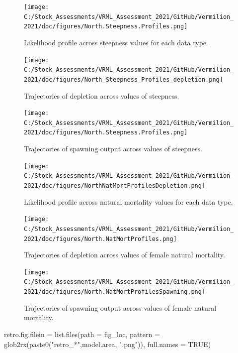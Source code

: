 \documentclass[
  english,
  a4paper,
]{article}
\newenvironment{Shaded}{\begin{snugshade}}{\end{snugshade}}
\newcommand{\AttributeTok}[1]{\textcolor[rgb]{0.77,0.63,0.00}{#1}}
\newcommand{\ConstantTok}[1]{\textcolor[rgb]{0.00,0.00,0.00}{#1}}
\newcommand{\FunctionTok}[1]{\textcolor[rgb]{0.00,0.00,0.00}{#1}}
\newcommand{\NormalTok}[1]{#1}
\newcommand{\OtherTok}[1]{\textcolor[rgb]{0.56,0.35,0.01}{#1}}
\newcommand{\StringTok}[1]{\textcolor[rgb]{0.31,0.60,0.02}{#1}}
\begin{document}
\begin{figure}
\centering
\texttt{[image: C:/Stock\_Assessments/VRML\_Assessment\_2021/GitHub/Vermilion\_2021/doc/figures/North.Steepness.Profiles.png]}
\caption{Likelihood profile across steepness values for each data type.\label{fig:h-profile}}
\end{figure}

\begin{figure}
\centering
\texttt{[image: C:/Stock\_Assessments/VRML\_Assessment\_2021/GitHub/Vermilion\_2021/doc/figures/North\_Steepness\_Profiles\_depletion.png]}
\caption{Trajectories of depletion across values of steepness.\label{fig:h-depl}}
\end{figure}

\begin{figure}
\centering
\texttt{[image: C:/Stock\_Assessments/VRML\_Assessment\_2021/GitHub/Vermilion\_2021/doc/figures/North.Steepness.Profiles.png]}
\caption{Trajectories of spawning output across values of steepness.\label{fig:h-spawn}}
\end{figure}

\begin{figure}
\centering
\texttt{[image: C:/Stock\_Assessments/VRML\_Assessment\_2021/GitHub/Vermilion\_2021/doc/figures/NorthNatMortProfilesDepletion.png]}
\caption{Likelihood profile across natural mortality values for each data type.\label{fig:m-profile}}
\end{figure}

\begin{figure}
\centering
\texttt{[image: C:/Stock\_Assessments/VRML\_Assessment\_2021/GitHub/Vermilion\_2021/doc/figures/North.NatMortProfiles.png]}
\caption{Trajectories of depletion across values of female natural mortality.\label{fig:m-depl}}
\end{figure}

\begin{figure}
\centering
\texttt{[image: C:/Stock\_Assessments/VRML\_Assessment\_2021/GitHub/Vermilion\_2021/doc/figures/North.NatMortProfilesSpawning.png]}
\caption{Trajectories of spawning output across values of female natural mortality.\label{fig:m-spawn}}
\end{figure}

\begin{Shaded}
\begin{Highlighting}[]
\NormalTok{retro.fig.filein }\OtherTok{=} \FunctionTok{list.files}\NormalTok{(}\AttributeTok{path =}\NormalTok{ fig\_loc,  }
                  \AttributeTok{pattern =} \FunctionTok{glob2rx}\NormalTok{(}\FunctionTok{paste0}\NormalTok{(}\StringTok{"retro\_*"}\NormalTok{,model.area, }\StringTok{".png"}\NormalTok{)), }
                  \AttributeTok{full.names =} \ConstantTok{TRUE}\NormalTok{)}
\end{Highlighting}
\end{Shaded}
\end{document}
